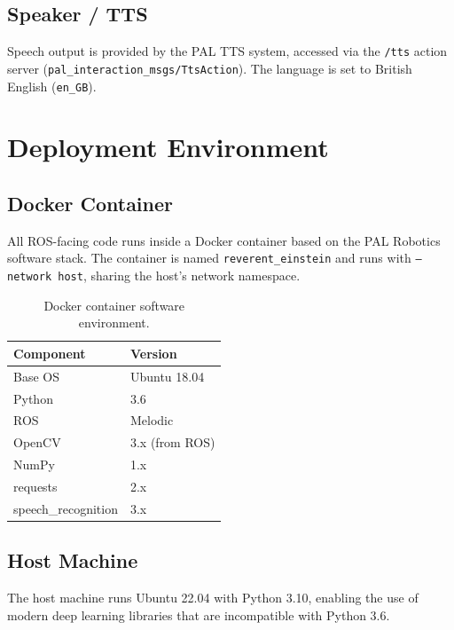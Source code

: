 \subsection{Speaker / TTS}

Speech output is provided by the PAL TTS system, accessed via the
\texttt{/tts} action server (\texttt{pal\_interaction\_msgs/TtsAction}).
The language is set to British English (\texttt{en\_GB}).

\section{Deployment Environment}

\subsection{Docker Container}

All ROS-facing code runs inside a Docker container based on the PAL Robotics
software stack.
The container is named \texttt{reverent\_einstein} and runs with \texttt{--network host},
sharing the host's network namespace.

\begin{table}[H]
\centering
\caption{Docker container software environment.}
\label{tab:docker_env}
\begin{tabular}{ll}
\toprule
\textbf{Component} & \textbf{Version} \\
\midrule
Base OS            & Ubuntu 18.04 \\
Python             & 3.6 \\
ROS                & Melodic \\
OpenCV             & 3.x (from ROS) \\
NumPy              & 1.x \\
requests           & 2.x \\
speech\_recognition & 3.x \\
\bottomrule
\end{tabular}
\end{table}

\subsection{Host Machine}

The host machine runs Ubuntu 22.04 with Python 3.10, enabling the use of modern
deep learning libraries that are incompatible with Python 3.6.


